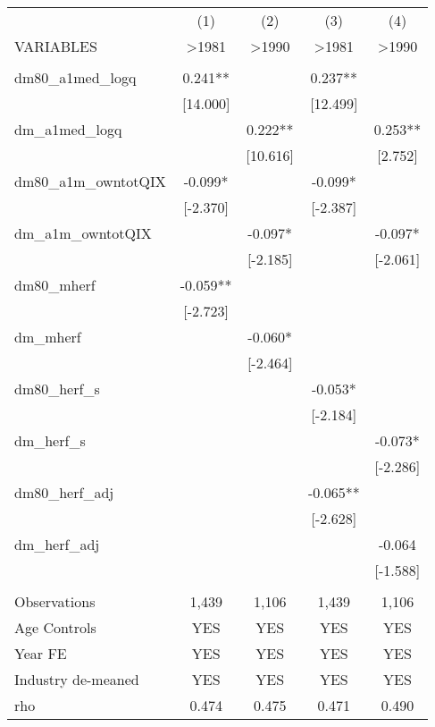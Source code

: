 \documentclass[]{article}
\begin{document}
\begin{tabular}{lcccc} \hline
 & (1) & (2) & (3) & (4) \\
VARIABLES & >1981 & >1990 & >1981 & >1990 \\ \hline
 &  &  &  &  \\
dm80\_a1med\_logq & 0.241** &  & 0.237** &  \\
 & [14.000] &  & [12.499] &  \\
dm\_a1med\_logq &  & 0.222** &  & 0.253** \\
 &  & [10.616] &  & [2.752] \\
dm80\_a1m\_owntotQIX & -0.099* &  & -0.099* &  \\
 & [-2.370] &  & [-2.387] &  \\
dm\_a1m\_owntotQIX &  & -0.097* &  & -0.097* \\
 &  & [-2.185] &  & [-2.061] \\
dm80\_mherf & -0.059** &  &  &  \\
 & [-2.723] &  &  &  \\
dm\_mherf &  & -0.060* &  &  \\
 &  & [-2.464] &  &  \\
dm80\_herf\_s &  &  & -0.053* &  \\
 &  &  & [-2.184] &  \\
dm\_herf\_s &  &  &  & -0.073* \\
 &  &  &  & [-2.286] \\
dm80\_herf\_adj &  &  & -0.065** &  \\
 &  &  & [-2.628] &  \\
dm\_herf\_adj &  &  &  & -0.064 \\
 &  &  &  & [-1.588] \\
 &  &  &  &  \\
Observations & 1,439 & 1,106 & 1,439 & 1,106 \\
Age Controls & YES & YES & YES & YES \\
Year FE & YES & YES & YES & YES \\
Industry de-meaned & YES & YES & YES & YES \\
 rho & 0.474 & 0.475 & 0.471 & 0.490 \\ \hline
\end{tabular}
\end{document}

